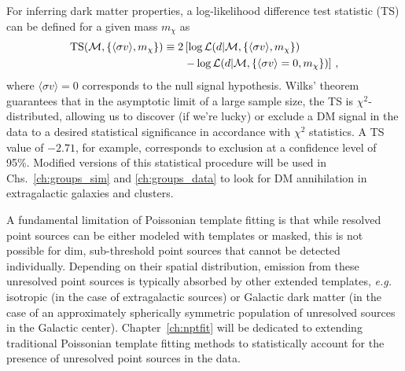For inferring dark matter properties, a log-likelihood difference test statistic (TS) can be defined for a given mass $m_\chi$ as
\begin{equation}\begin{aligned}
{\rm TS}(\mathcal{M}, \{ \langle\sigma v\rangle, m_\chi\}) \equiv 2 &\left[ \log \mathcal{L}(d | \mathcal{M}, \{\langle\sigma v\rangle, m_\chi \}) \right.\\
&\left.- \log \mathcal{L}(d | \mathcal{M}, \{{\langle\sigma v\rangle=0}, m_\chi \}) \right]\,,
\label{eq:TSdef_darksky}
\end{aligned}\end{equation}
where $\langle\sigma v\rangle=0$ corresponds to the null signal hypothesis. Wilks' theorem guarantees that in the asymptotic limit of a large sample size, the TS is $\chi^2$-distributed, allowing us to discover (if we're lucky) or exclude a DM signal in the data to a desired statistical significance in accordance with $\chi^2$ statistics. A TS value of $-2.71$, for example, corresponds to exclusion at a confidence level of 95\%. Modified versions of this statistical procedure will be used in Chs.~\ref{ch:groups_sim} and \ref{ch:groups_data} to look for DM annihilation in extragalactic galaxies and clusters.

A fundamental limitation of Poissonian template fitting is that while resolved point sources can be either modeled with templates or masked, this is not possible for dim, sub-threshold point sources that cannot be detected individually. Depending on their spatial distribution, emission from these unresolved point sources is typically absorbed by other extended templates, \emph{e.g.} isotropic (in the case of extragalactic sources) or Galactic dark matter (in the case of an approximately spherically symmetric population of unresolved sources in the Galactic center). Chapter~\ref{ch:nptfit} will be dedicated to extending traditional Poissonian template fitting methods to statistically account for the presence of unresolved point sources in the data.

